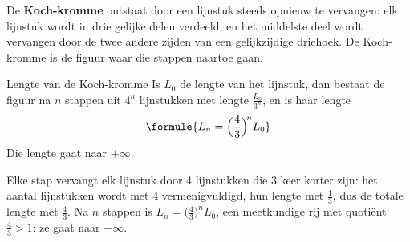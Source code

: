 
\begin{theorie}
De \textbf{\textcolor{accent}{Koch-kromme}} ontstaat door een lijnstuk steeds opnieuw te vervangen: elk lijnstuk wordt in drie gelijke delen verdeeld, en het middelste deel wordt vervangen door de twee andere zijden van een gelijkzijdige driehoek. De Koch-kromme is de figuur waar die stappen naartoe gaan.

\begin{stelling}{Lengte van de Koch-kromme}
Is $L_0$ de lengte van het lijnstuk, dan bestaat de figuur na $n$ stappen uit $4^n$ lijnstukken met lengte $\tfrac{L_0}{3^n}$, en is haar lengte
\[
\formule{L_n = \Bigl(\frac43\Bigr)^{\!n} L_0}
\]
Die lengte gaat naar $+\infty$.
\end{stelling}

\begin{bewijs}
Elke stap vervangt elk lijnstuk door 4 lijnstukken die 3 keer korter zijn: het aantal lijnstukken wordt met 4 vermenigvuldigd, hun lengte met $\tfrac13$, dus de totale lengte met $\tfrac43$. Na $n$ stappen is $L_n = \bigl(\tfrac43\bigr)^n L_0$, een meetkundige rij met quotiënt $\tfrac43 > 1$: ze gaat naar $+\infty$.
\end{bewijs}
\end{theorie}

